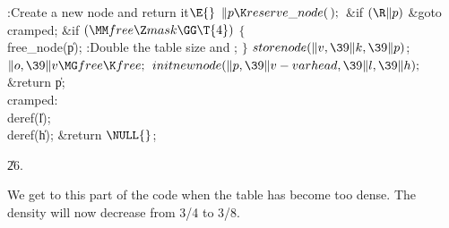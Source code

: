 \Y\B\4:Create a new node and return it\X${}\E{}$\6
$\|p\K\\{reserve\_node}(\,);{}$\6
\&{if} ${}(\R\|p){}$\1\5
\&{goto} \\{cramped};\2\6
\&{if} ${}(\MM\\{free}\Z\\{mask}\GG\T{4}){}$\5
${}\{{}$\1\6
\\{free\_node}(\|p);\6
:Double the table size and \X;\6
\4${}\}{}$\2\6
${}\\{storenode}(\|v,\39\|k,\39\|p){}$;\5
${}\|o,\39\|v\MG\\{free}\K\\{free};{}$\6
${}\\{initnewnode}(\|p,\39\|v-\\{varhead},\39\|l,\39\|h);{}$\6
\&{return} \|p;\6
\4\\{cramped}:\6
\\{deref}(\|l);\6
\\{deref}(\|h);\6
\&{return} ${}\NULL{}$;\par
\U26.\fi

We get to this part of the code when the table has become too dense.
The density will now decrease from 3/4 to 3/8.

